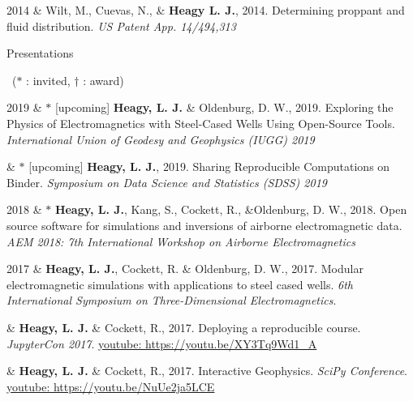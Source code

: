 \documentclass[a4paper, 11pt]{article}
\newcommand{\youtube}[1]{\href{https://youtu.be/XY3Tq9Wd1\_A}{youtube: #1}}
\newcommand{\subheading}[1]{
    \vspace{0.3cm}
    {%
    \Large
    #1}\\
    \vspace{0.0cm}
}
\begin{document}
\begin{entryright}
2014 & Wilt, M., Cuevas, N., \& \textbf{Heagy L. J.}, 2014. Determining proppant and fluid distribution. \emph{US Patent App. 14/494,313}
\end{entryright}



\subheading{Presentations}

\vspace{-0.3cm}
~($*$ : invited,  $\dagger$ : award)
\vspace{0.2cm}

\begin{entryright}
2019 & $*$ [upcoming] \textbf{Heagy, L. J.} \& Oldenburg, D. W., 2019. Exploring the Physics of Electromagnetics with Steel-Cased Wells Using Open-Source Tools. \emph{International Union of Geodesy and Geophysics (IUGG) 2019}
\end{entryright}

\begin{entryright}
& $*$ [upcoming] \textbf{Heagy, L. J.}, 2019. Sharing Reproducible Computations on Binder. \emph{Symposium on Data Science and Statistics (SDSS) 2019}
\end{entryright}

\begin{entryright}
2018 & $*$ \textbf{Heagy, L. J.}, Kang, S., Cockett, R., \&Oldenburg, D. W., 2018. Open source software for simulations and inversions of airborne electromagnetic data. \emph{AEM 2018: 7th International Workshop on Airborne Electromagnetics}
\end{entryright}

\begin{entryright}
2017 & \textbf{Heagy, L. J.}, Cockett, R. \& Oldenburg, D. W., 2017. Modular electromagnetic simulations with applications to steel cased wells. \emph{6th International Symposium on Three-Dimensional Electromagnetics}.
\end{entryright}

\begin{entryright}
& \textbf{Heagy, L. J.} \& Cockett, R., 2017. Deploying a reproducible course. \emph{JupyterCon 2017}. \youtube{https://youtu.be/XY3Tq9Wd1\_A}
\end{entryright}

\begin{entryright}
& \textbf{Heagy, L. J.} \& Cockett, R., 2017. Interactive Geophysics. \emph{SciPy Conference}. \youtube{https://youtu.be/NuUe2ja5LCE}
\end{entryright}
\end{document}
